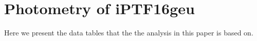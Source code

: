 \documentclass[a4paper,fleqn,usenatbib]{mnras}
\newcommand{\geu}{iPTF16geu\xspace}
\newcommand{\sn}{SN\xspace}
\begin{document}
\section{Photometry of \geu}
Here we present the data tables that the the analysis in this paper is based on.

\begin{landscape}
\begin{table}
	\centering
	\caption{%
		Derived photometry for the four lensed \sn images.  The first error quoted for each measurement is the statistical
		uncertainty that is expected to uncorrelated between epochs.  This includes the expected PSF variations discussed
		in \S\ref{sec:wfcpsf}.  The second error, is the systematic error from the background model fit discussed in the text.
		This is will be correlated for measurements obtained with the same filter.
	\label{tb:resolvflux}}
	
\end{table}
\end{landscape}



\bsp	%
\label{lastpage}
\end{document}

